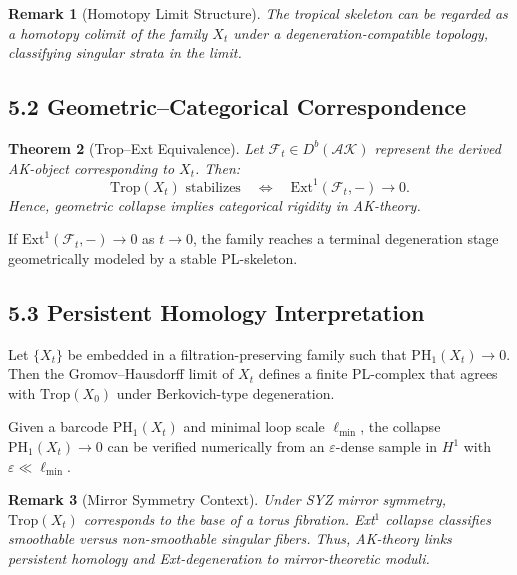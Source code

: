 \documentclass[11pt]{article}
\newtheorem{theorem}{Theorem}[section]
\newtheorem{remark}[theorem]{Remark}
\begin{document}
\begin{remark}[Homotopy Limit Structure]
The tropical skeleton can be regarded as a homotopy colimit of the family $X_t$ under a degeneration-compatible topology, classifying singular strata in the limit.
\end{remark}

\subsection{5.2 Geometric–Categorical Correspondence}

\begin{theorem}[Trop--Ext Equivalence]
Let $\mathcal{F}_t \in D^b(\mathcal{AK})$ represent the derived AK-object corresponding to $X_t$. Then:
\[
\mathrm{Trop}(X_t) \text{ stabilizes} \quad \Longleftrightarrow \quad \mathrm{Ext}^1(\mathcal{F}_t, -) \to 0.
\]
Hence, geometric collapse implies categorical rigidity in AK-theory.
\end{theorem}

\begin{corollary}
If $\mathrm{Ext}^1(\mathcal{F}_t, -) \to 0$ as $t \to 0$, the family reaches a terminal degeneration stage geometrically modeled by a stable PL-skeleton.
\end{corollary}

\subsection{5.3 Persistent Homology Interpretation}

\begin{lemma}
Let $\{X_t\}$ be embedded in a filtration-preserving family such that $\mathrm{PH}_1(X_t) \to 0$. Then the Gromov--Hausdorff limit of $X_t$ defines a finite PL-complex that agrees with $\mathrm{Trop}(X_0)$ under Berkovich-type degeneration.
\end{lemma}

\begin{proposition}
Given a barcode $\mathrm{PH}_1(X_t)$ and minimal loop scale $\ell_{\min}$, the collapse $\mathrm{PH}_1(X_t) \to 0$ can be verified numerically from an $\varepsilon$-dense sample in $H^1$ with $\varepsilon \ll \ell_{\min}$.
\end{proposition}

\begin{remark}[Mirror Symmetry Context]
Under SYZ mirror symmetry, $\mathrm{Trop}(X_t)$ corresponds to the base of a torus fibration. Ext$^1$ collapse classifies smoothable versus non-smoothable singular fibers. Thus, AK-theory links persistent homology and Ext-degeneration to mirror-theoretic moduli.
\end{remark}
\end{document}
